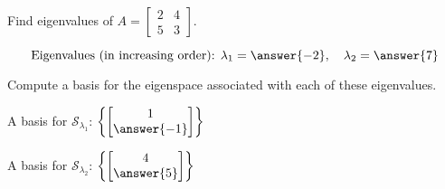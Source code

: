 \documentclass{ximera}
\author{}
\begin{document}
\begin{exercise}
Find eigenvalues of $A=\begin{bmatrix} 2 & 4\\5 & 3\end{bmatrix}$.

$$\text{Eigenvalues (in increasing order): }\lambda_1=\answer{-2}, \quad\lambda_2=\answer{7}$$

Compute a basis for the eigenspace associated with each of these eigenvalues.

A basis for $\mathcal{S}_{\lambda_1}$: $\left\{\begin{bmatrix}1\\\answer{-1}\end{bmatrix}\right\}$

A basis for $\mathcal{S}_{\lambda_2}$: $\left\{\begin{bmatrix}4\\\answer{5}\end{bmatrix}\right\}$

 \end{exercise}
 
\end{document}
